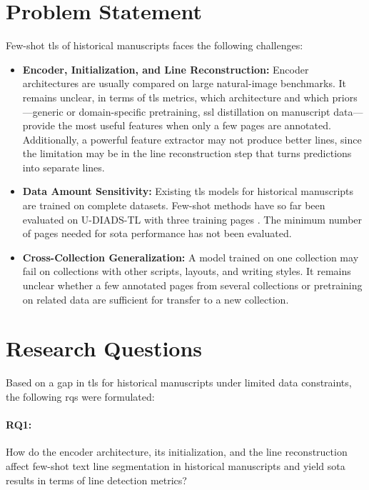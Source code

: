 \section{Problem Statement}
\label{sec:problem-statement}

Few-shot \gls{tls} of historical manuscripts faces the following challenges:
\begin{itemize}
	\item \textbf{Encoder, Initialization, and Line Reconstruction:} Encoder architectures are usually compared on large natural-image benchmarks. It remains unclear, in terms of \gls{tls} metrics, which architecture and which priors---generic or domain-specific pretraining, \gls{ssl} distillation on manuscript data---provide the most useful features when only a few pages are annotated. Additionally, a powerful feature extractor may not produce better lines, since the limitation may be in the line reconstruction step that turns predictions into separate lines.
	\item \textbf{Data Amount Sensitivity:} Existing \gls{tls} models for historical manuscripts are trained on complete datasets. Few-shot methods have so far been evaluated on U-DIADS-TL with three training pages \cite{zottin2025exploring, Zottin_2025_FEST}. The minimum number of pages needed for \gls{sota} performance has not been evaluated.
	\item \textbf{Cross-Collection Generalization:} A model trained on one collection may fail on collections with other scripts, layouts, and writing styles. It remains unclear whether a few annotated pages from several collections or pretraining on related data are sufficient for transfer to a new collection.
\end{itemize}



\section{Research Questions}
\label{sec:rqs}\label{ch:rqs}

Based on a gap in \gls{tls} for historical manuscripts under limited data constraints, the following \glspl{rq} were formulated:

\paragraph{RQ1:} How do the encoder architecture, its initialization, and the line reconstruction affect few-shot text line segmentation in historical manuscripts and yield \gls{sota} results in terms of line detection metrics?


